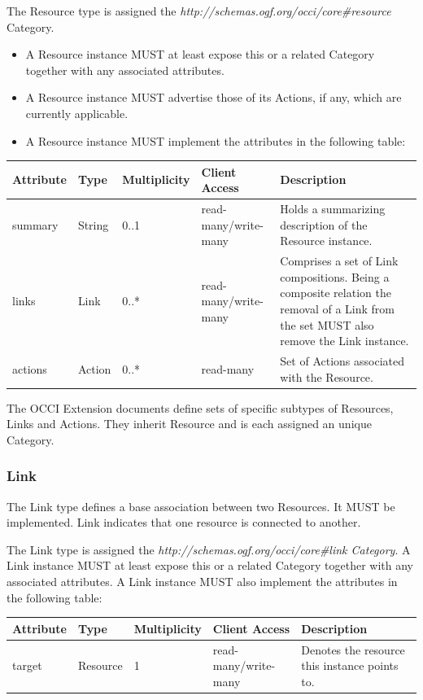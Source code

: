 \documentclass[10pt,a4paper]{article}
\begin{document}
The Resource type is assigned the \textit{http://schemas.ogf.org/occi/core\#resource} Category.

\begin{itemize}
  \item A Resource instance MUST at least expose this or a related Category together with any associated attributes.
  \item A Resource instance MUST advertise those of its Actions, if any, which are currently applicable.
  \item A Resource instance MUST implement the attributes in the following table:
\end{itemize}

\begin{tabular}{l|l|l|l|p{2.7in}}
Attribute & Type & Multiplicity & Client Access & Description \\
\hline
summary & String & 0..1 & read-many/write-many & Holds a summarizing description of the Resource instance.\\
links & Link & 0..* & read-many/write-many & Comprises a set of Link compositions. Being a composite relation the removal of a Link from the set MUST also remove the Link instance.\\
actions & Action & 0..* & read-many & Set of Actions associated with the Resource.\\
\end{tabular}

The OCCI Extension documents define sets of specific subtypes of Resources, Links and Actions. They inherit Resource and is each assigned an unique Category.

\subsubsection{Link}
The Link type defines a base association between two Resources. It MUST be implemented. Link indicates that one resource is connected to another.

The Link type is assigned the \textit{http://schemas.ogf.org/occi/core\#link Category}. A Link instance MUST at least expose this or a related Category together with any associated attributes. A Link instance MUST also implement the attributes in the following table:

\begin{tabular}{l|l|l|l|p{2.7in}}
Attribute & Type & Multiplicity & Client Access & Description \\
\hline
target & Resource & 1 & read-many/write-many & Denotes the resource this instance points to.\\
\end{tabular}
\end{document}
